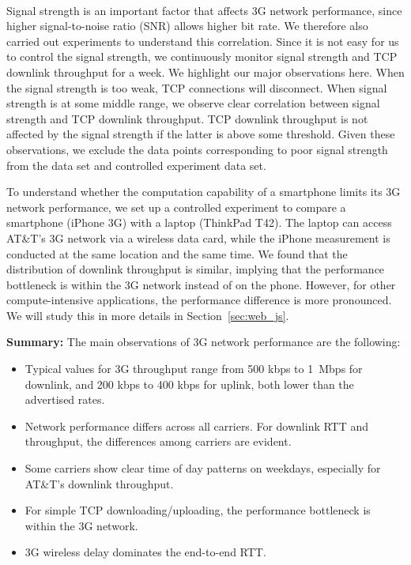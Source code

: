 \begin{figure}[t]
\centering
{}\\
\label{fig:cdn.handshake}
\end{figure}

 
\label{sec:net.signal}

Signal strength is an important factor that affects 3G network
performance, since higher signal-to-noise ratio (SNR) allows higher 
bit rate. We therefore also carried out experiments to understand
this correlation. Since it is not easy for us to control the signal
strength, we continuously monitor signal strength and TCP downlink
throughput for a week. We highlight 
our major observations here. When the signal strength is too weak, 
TCP connections will disconnect. When signal strength is at some 
middle range, we observe clear correlation between signal strength 
and TCP downlink throughput. TCP downlink throughput is not affected 
by the signal strength if the latter is above some threshold. Given 
these observations, we exclude the data points corresponding to poor 
signal strength from the \mobiperf data set and controlled experiment data set.

\label{sec:net.platform}

To understand whether the computation capability of a smartphone
limits its 3G network performance, we set up a controlled experiment to
compare a smartphone (iPhone 3G) with a laptop (ThinkPad T42). The 
laptop can access AT\&T's 3G network via a wireless data card, while 
the iPhone measurement is conducted at the same location and the 
same time. We found that the distribution of downlink throughput is 
similar, implying that the performance bottleneck is within the 
3G network instead of on the phone. However, for other 
compute-intensive applications, the performance difference is
more pronounced. We will study this in more details in Section~\ref{sec:web_js}.

\noindent\textbf{Summary:} The main observations of 3G network performance are the following:
\begin{itemize}
\item Typical values for 3G throughput range from 500 kbps to 1~Mbps
for downlink, and 200 kbps to 400 kbps for uplink, both lower than 
the advertised rates.
\item Network performance differs across all carriers. For downlink 
RTT and throughput, the differences among carriers are evident.
\item Some carriers show clear time of day patterns on weekdays, especially for AT\&T's downlink throughput.
\item For simple TCP downloading/uploading, the performance bottleneck is within the 3G network.
\item 3G wireless delay dominates the end-to-end RTT.
\end{itemize}

